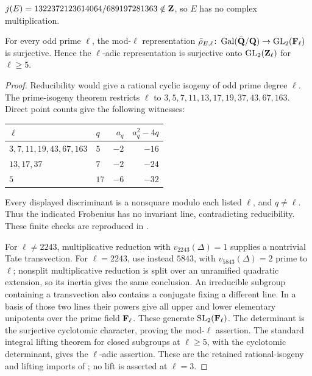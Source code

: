 \begin{proposition}\label{prop:noncm}
$j(E)=1322372123614064/689197281363\notin\mathbf{Z}$, so $E$ has no complex multiplication.
\end{proposition}

\begin{theorem}\label{thm:image}
For every odd prime $\ell$, the mod-$\ell$ representation $\bar\rho_{E,\ell}\colon\operatorname{Gal}(\bar{\mathbf{Q}}/\mathbf{Q})\to\operatorname{GL}_2(\mathbf{F}_\ell)$ is surjective. Hence the $\ell$-adic representation is surjective onto $\operatorname{GL}_2(\mathbf{Z}_\ell)$ for $\ell\ge5$.
\end{theorem}
\begin{proof}
Reducibility would give a rational cyclic isogeny of odd prime degree $\ell$. The prime-isogeny theorem restricts $\ell$ to $3,5,7,11,13,17,19,37,43,67,163$. Direct point counts give the following witnesses:
\begin{center}\begin{tabular}{@{}llrr@{}}\toprule
$\ell$ & $q$ & $a_q$ & $a_q^2-4q$\\\midrule
$3,7,11,19,43,67,163$ & $5$ & $-2$ & $-16$\\
$13,17,37$ & $7$ & $-2$ & $-24$\\
$5$ & $17$ & $-6$ & $-32$\\\bottomrule
\end{tabular}\end{center}
Every displayed discriminant is a nonsquare modulo each listed $\ell$, and $q\ne\ell$. Thus the indicated Frobenius has no invariant line, contradicting reducibility. These finite checks are reproduced in .

For $\ell\ne2243$, multiplicative reduction with $v_{2243}(\Delta)=1$ supplies a nontrivial Tate transvection. For $\ell=2243$, use instead $5843$, with $v_{5843}(\Delta)=2$ prime to $\ell$; nonsplit multiplicative reduction is split over an unramified quadratic extension, so its inertia gives the same conclusion. An irreducible subgroup containing a transvection also contains a conjugate fixing a different line. In a basis of those two lines their powers give all upper and lower elementary unipotents over the prime field $\mathbf{F}_\ell$. These generate $\mathrm{SL}_2(\mathbf{F}_\ell)$. The determinant is the surjective cyclotomic character, proving the mod-$\ell$ assertion. The standard integral lifting theorem for closed subgroups at $\ell\ge5$, with the cyclotomic determinant, gives the $\ell$-adic assertion. These are the retained rational-isogeny and lifting imports of ; no lift is asserted at $\ell=3$.
\end{proof}

